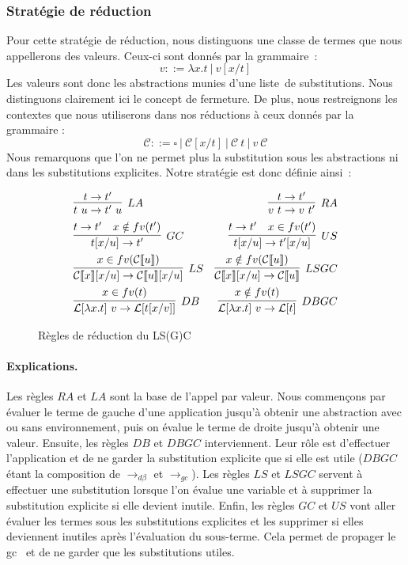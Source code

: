 \documentclass[a4paper, 11pt]{article}
\theoremstyle{definition}
\newcommand{\mcc}{\mathcal{C}}
\newcommand{\ra}{\rightarrow}
\begin{document}
\subsubsection{Stratégie de réduction}
Pour cette stratégie de réduction, nous distinguons une classe de termes que nous appellerons des valeurs.
Ceux-ci sont donnés par la grammaire~:
\[v ::= \lambda x.t~|~v[x/t]\]
Les valeurs sont donc les abstractions munies d'une \og liste\fg~de substitutions. Nous distinguons clairement ici le concept de fermeture.
De plus, nous restreignons les contextes que nous utiliserons dans nos réductions à ceux donnés par la grammaire : 
\[\mcc ::= \square~|~\mcc[x/t]~|~\mcc~t~|~v~\mcc\]
Nous remarquons que l'on ne permet plus la substitution sous les abstractions ni dans les substitutions explicites.
Notre stratégie est donc définie ainsi~:
\begin{figure}[!h]
    \centering
    \begin{align*}
    &\infer[LA]{t~u\rightarrow t'~u}{t \rightarrow t'}
 &\infer[RA]{v~t\rightarrow v~t'}{t \rightarrow t'}\\
&\infer[GC]{t[x/u]\rightarrow t'}{t \rightarrow t' & x \notin fv(t') }
&\infer[US]{t[x/u]\rightarrow t'[x/u]}{t \rightarrow t' & x \in fv(t')}\\
&\infer[LS]{\mathcal{C}\llbracket x \rrbracket [x/u]\rightarrow \mathcal{C}\llbracket u \rrbracket [x/u]}{x \in fv(\mathcal{C}\llbracket u \rrbracket) }
&\infer[LSGC]{\mathcal{C}\llbracket x \rrbracket [x/u]\rightarrow \mathcal{C}\llbracket u \rrbracket}{x \notin fv(\mathcal{C}\llbracket u \rrbracket) }\\
&\infer[DB]{\mathcal{L}[\lambda x.t]~v \rightarrow \mathcal{L}[t[x/v]]}{x\in fv(t)}
&\infer[DBGC]{\mathcal{L}[\lambda x.t]~v \rightarrow \mathcal{L}[t]}{x\notin fv(t)}
\end{align*}
    \caption{Règles de réduction du LS(G)C}
\end{figure}
\paragraph{Explications.}
Les règles $RA$ et $LA$ sont la base de l'appel par valeur. 
Nous commençons par évaluer le terme de gauche d'une application jusqu'à obtenir une abstraction avec ou sans environnement, 
puis on évalue le terme de droite jusqu'à obtenir une valeur. Ensuite, les règles $DB$ et $DBGC$ interviennent. 
Leur rôle est d'effectuer l'application et de ne garder la substitution explicite que si elle est utile 
($DBGC$ étant la composition de $\ra_{d\beta}$ et $\ra_{gc}$). 
Les règles $LS$ et $LSGC$ servent à effectuer une substitution lorsque l'on évalue une variable et à supprimer la substitution explicite si elle devient inutile. 
Enfin, les règles $GC$ et $US$ vont aller évaluer les termes sous les substitutions explicites et les supprimer si elles deviennent inutiles après l'évaluation du sous-terme.
Cela permet de propager le \og gc \fg~et de ne garder que les substitutions utiles.
\end{document}
